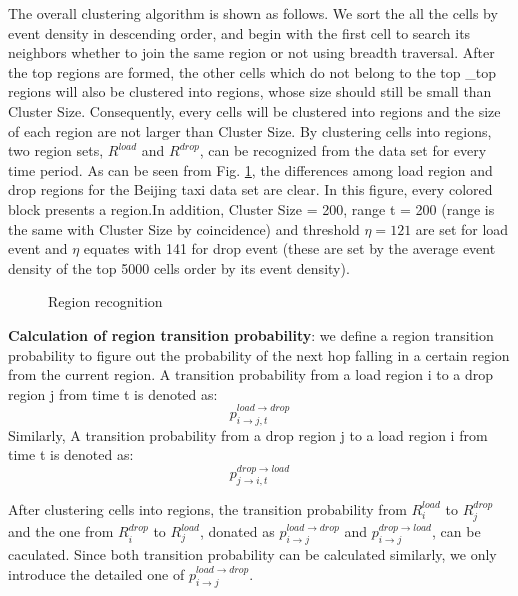 The overall clustering algorithm is shown as follows. We sort the all the cells by event density in descending order, 
and begin with the first cell to search its neighbors whether to join the same region or not using breadth traversal. 
After the top regions are formed, the other cells which do not belong to the top \_top regions will also be clustered into regions, 
whose size should still be small than Cluster Size. Consequently, every cells will be clustered into regions and the size of each region are not larger than Cluster Size.
By clustering cells into regions, two region sets, \textbf{$R^{load}$} and \textbf{$R^{drop}$}, can be recognized from the data set for every time period. As can be seen from Fig. \ref{figure_region_recognizition}, the differences among load region and drop regions for the Beijing taxi data set are clear.
In this figure, every colored block presents a region.In addition, Cluster Size = 200, range t = 200 (range is the same with Cluster Size by coincidence) and threshold $\eta = 121$ are set for load event and $\eta$ equates with 141 for drop event (these are set by the average event density of the top 5000 cells order by its event density).

\begin{figure}[!t]
\centering
{}
\centering
\caption{Region recognition}\label{figure_region_recognizition}
\end{figure}

\textbf{Calculation of region transition probability}:
we define a region transition probability to figure out the probability of the next hop falling in a certain region from the current region.  A transition probability from a load region i to a drop region j from time t is denoted as:
\begin{equation}
p^{load\rightarrow drop}_{i\rightarrow j,t}
\end{equation}
Similarly, A transition probability from a drop region j to a load region i from time t is denoted as:
\begin{equation}
p^{drop\rightarrow load}_{j\rightarrow i,t}
\end{equation}


 After clustering cells into regions, the transition probability from $R_i^{load}$ to $R_j^{drop}$ and the one from $R_i^{drop}$ to $R_j^{load}$, donated as $p_{i\rightarrow j}^{load\rightarrow drop}$ and $p_{i\rightarrow j}^{drop\rightarrow load}$, can be caculated. Since both transition probability can be calculated similarly, we only introduce the detailed one of $p_{i\rightarrow j}^{load\rightarrow drop}$.

